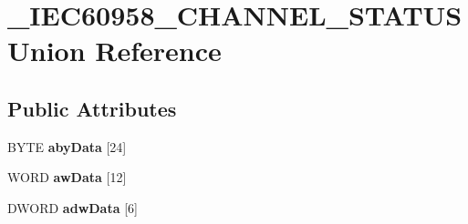 \hypertarget{union__IEC60958__CHANNEL__STATUS}{\section{\-\_\-\-I\-E\-C60958\-\_\-\-C\-H\-A\-N\-N\-E\-L\-\_\-\-S\-T\-A\-T\-U\-S Union Reference}
\label{union__IEC60958__CHANNEL__STATUS}
}
\subsection*{Public Attributes}
\begin{DoxyCompactItemize}
\item 
\hypertarget{union__IEC60958__CHANNEL__STATUS_a10fc722b565ef25f54b247a88b032bef}{B\-Y\-T\-E {\bfseries aby\-Data} \mbox{[}24\mbox{]}}\label{union__IEC60958__CHANNEL__STATUS_a10fc722b565ef25f54b247a88b032bef}

\item 
\hypertarget{union__IEC60958__CHANNEL__STATUS_a252775826f62f70a0f4ab8e62709f3fb}{W\-O\-R\-D {\bfseries aw\-Data} \mbox{[}12\mbox{]}}\label{union__IEC60958__CHANNEL__STATUS_a252775826f62f70a0f4ab8e62709f3fb}

\item 
\hypertarget{union__IEC60958__CHANNEL__STATUS_a10e8e90fc0b03b9214a91aa96b6415a6}{D\-W\-O\-R\-D {\bfseries adw\-Data} \mbox{[}6\mbox{]}}\label{union__IEC60958__CHANNEL__STATUS_a10e8e90fc0b03b9214a91aa96b6415a6}


\end{DoxyCompactItemize}
